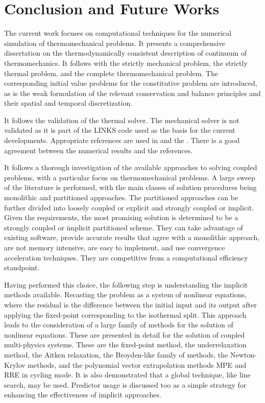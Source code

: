 \chapter{Conclusion and Future Works} \label{ch:conclusions}

The current work focuses on computational techniques for the numerical simulation of thermomechanical problems.
It presents a comprehensive dissertation on the thermodynamically consistent description of continuum of thermomechanics.
It follows with the strictly mechanical problem, the strictly thermal problem, and the complete thermomechanical problem.
The corresponding initial value problems for the constitutive problem are introduced, as is the weak formulation of the relevant conservation and balance principles and their spatial and temporal discretization.

It follows the validation of the thermal solver.
The mechanical solver is not validated as it is part of the LINKS code used as the basis for the current developments.
Appropriate references are used in \cite{DINEN1991_1_2} and the \cite{NAFEMSbenchmarks}.
There is a good agreement between the numerical results and the references.

It follows a thorough investigation of the available approaches to solving coupled problems, with a particular focus on thermomechanical problems.
A large sweep of the literature is performed, with the main classes of solution procedures being monolithic and partitioned approaches.
The partitioned approaches can be further divided into loosely coupled or explicit and strongly coupled or implicit.
Given the requirements, the most promising solution is determined to be a strongly coupled or implicit partitioned scheme.
They can take advantage of existing software, provide accurate results that agree with a monolithic approach, are not memory intensive, are easy to implement, and use convergence acceleration techniques. They are competitive from a computational efficiency standpoint.

Having performed this choice, the following step is understanding the implicit methods available.
Recasting the problem as a system of nonlinear equations, where the residual is the difference between the initial input and its output after applying the fixed-point corresponding to the isothermal split.
This approach leads to the consideration of a large family of methods for the solution of nonlinear equations.
These are presented in detail for the solution of coupled multi-physics systems.
These are the fixed-point method, the underrelaxation method, the Aitken relaxation, the Broyden-like family of methods, the Newton-Krylov methods, and the polynomial vector extrapolation methods MPE and RRE in cycling mode.
It is also demonstrated that a global technique, like line search, may be used.
Predictor usage is discussed too as a simple strategy for enhancing the effectiveness of implicit approaches.

